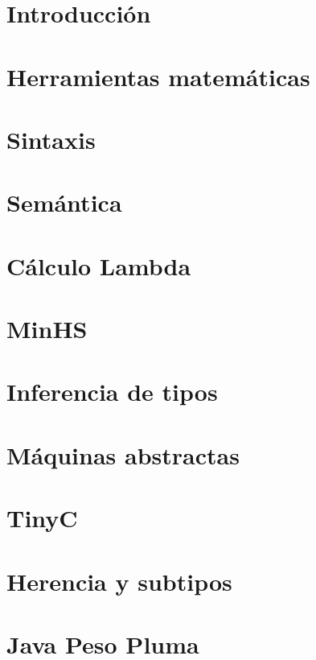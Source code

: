 \documentclass[8pt]{report}
\begin{document}
			        
		
		\setcounter{page}{0}
			
			
		
		\tableofcontents
		\newpage\phantom{~}\newpage
		
		\setcounter{page}{0}    
		
		\chapter{Introducción}
		\label{sec:intro}
			
		
		\chapter{Herramientas matemáticas}
			
		
		\chapter{Sintaxis}
		\label{sec:sintax}
			
		
		\chapter{Semántica}
		\label{sec:semantics}
			
		
		\chapter{Cálculo Lambda}
			
		
		\chapter{\textsf{MinHS}}
			
		
		\chapter{Inferencia de tipos}
			
		
		\chapter{Máquinas abstractas}
			
		
		\chapter{TinyC}
			
		
		\chapter{Herencia y subtipos}
			
		
		\chapter{Java Peso Pluma}
			
		
		



	
\end{document}
